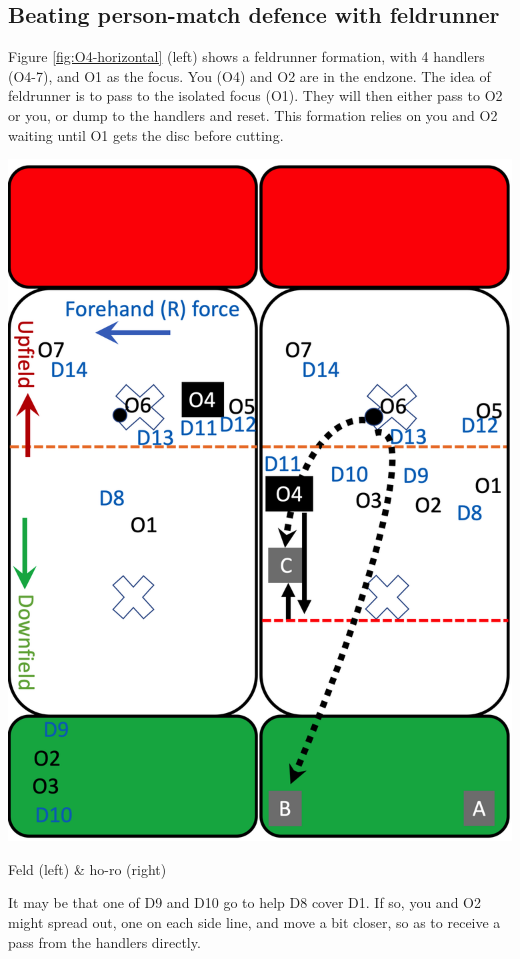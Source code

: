 \documentclass{tufte-handout}
\begin{document}
\subsection{Beating person-match defence with feldrunner}
\label{sec:feld}
Figure \ref{fig:O4-horizontal} (left) 
shows a feldrunner formation, 
with 4 handlers (O4-7), 
and O1 as the focus.
You  
(O4) 
and O2
are in the endzone. The idea of feldrunner 
is to pass to 
the isolated
focus (O1). 
They will then either pass to 
O2 or you, 
or dump to the handlers
and reset. This formation relies 
on you and O2 
waiting until O1 
gets the disc 
before cutting.  
\begin{marginfigure}%
  \includegraphics[width=\linewidth]{O4-horizontal}
  \caption{Feld (left) \& ho-ro (right)}
  \label{fig:O4-horizontal}
\end{marginfigure}

It may be that 
one of 
D9 
and D10 
go to help D8 
cover D1.  
If so, 
you and O2 
might spread out, 
one on each side line,
and move a bit closer, 
so as to receive a pass from 
the handlers directly.  
\end{document}
